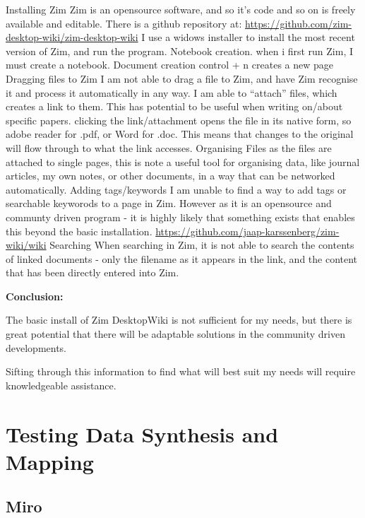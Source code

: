 \documentclass{article}
\begin{document}
\begin{outline}
\1 Installing Zim
    \2 Zim is an opensource software, and so it's code and so on is freely available and editable. There is a github repository at: \url{https://github.com/zim-desktop-wiki/zim-desktop-wiki}
    \2 I use a widows installer to install the most recent version of Zim, and run the program.
\1 Notebook creation.
    \2 when i first run Zim, I must create a notebook.
\1 Document creation
    \2 control + n creates a new page
\1 Dragging files to Zim
    \2 I am not able to drag a file to Zim, and have Zim recognise it and process it automatically in any way.
    \2 I am able to ``attach'' files, which creates a link to them. This has potential to be useful when writing on/about specific papers. 
    \2 clicking the link/attachment opens the file in its native form, so adobe reader for .pdf, or Word for .doc. This means that changes to the original will flow through to what the link accesses.
\1 Organising Files
    \2 as the files are attached to single pages, this is note a useful tool for organising data, like journal articles, my own notes, or other documents, in a way that can be networked automatically.
\1 Adding tags/keywords
    \2 I am unable to find a way to add tags or searchable keyworods to a page in Zim. However as it is an opensource and communty driven program - it is highly likely that something exists that enables this beyond the basic installation. 
    \2 \url{https://github.com/jaap-karssenberg/zim-wiki/wiki}
\1 Searching
    \2 When searching in Zim, it is not able to search the contents of linked documents - only the filename as it appears in the link, and the content that has been directly entered into Zim.
\end{outline}

\textbf{Conclusion:}

The basic install of Zim DesktopWiki is not sufficient for my needs, but there is great potential that there will be adaptable solutions in the community driven developments. 

Sifting through this information to find what will best suit my needs will require knowledgeable assistance.

\pagebreak

\section{Testing Data Synthesis and Mapping}

\subsection{Miro}
\end{document}
